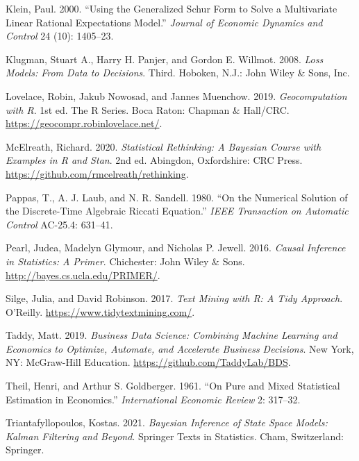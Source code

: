 \documentclass[
  letterpaper,
]{book}
\newlength{\cslhangindent}
\newlength{\cslentryspacingunit} %
\newenvironment{CSLReferences}[2] %
 {%
  \setlength{\parindent}{0pt}
  \ifodd #1
  \let\oldpar\par
  \def\par{\hangindent=\cslhangindent\oldpar}
  \fi
  \setlength{\parskip}{#2\cslentryspacingunit}
 }%
 {}
\begin{document}
\begin{CSLReferences}{1}{0}
\leavevmode{}%
Klein, Paul. 2000. {``Using the Generalized {S}chur Form to Solve a
Multivariate Linear Rational Expectations Model.''} \emph{Journal of
Economic Dynamics and Control} 24 (10): 1405--23.

\leavevmode{}%
Klugman, Stuart A., Harry H. Panjer, and Gordon E. Willmot. 2008.
\emph{Loss Models: From Data to Decisions}. Third. Hoboken, N.J.: John
Wiley \& Sons, Inc.

\leavevmode{}%
Lovelace, Robin, Jakub Nowosad, and Jannes Muenchow. 2019.
\emph{Geocomputation with {R}}. 1st ed. The {R} Series. Boca Raton:
Chapman \& Hall/CRC. \url{https://geocompr.robinlovelace.net/}.

\leavevmode{}%
McElreath, Richard. 2020. \emph{Statistical Rethinking: A Bayesian
Course with Examples in {R} and Stan}. 2nd ed. Abingdon, Oxfordshire:
CRC Press. \url{https://github.com/rmcelreath/rethinking}.

\leavevmode{}%
Pappas, T., A. J. Laub, and N. R. Sandell. 1980. {``On the Numerical
Solution of the Discrete-Time Algebraic Riccati Equation.''} \emph{IEEE
Transaction on Automatic Control} AC-25.4: 631--41.

\leavevmode{}%
Pearl, Judea, Madelyn Glymour, and Nicholas P. Jewell. 2016.
\emph{Causal Inference in Statistics: A Primer}. Chichester: John Wiley
\& Sons. \url{http://bayes.cs.ucla.edu/PRIMER/}.

\leavevmode{}%
Silge, Julia, and David Robinson. 2017. \emph{Text Mining with {R}: A
{T}idy Approach}. O'Reilly. \url{https://www.tidytextmining.com/}.

\leavevmode{}%
Taddy, Matt. 2019. \emph{Business Data Science: Combining Machine
Learning and Economics to Optimize, Automate, and Accelerate Business
Decisions}. New York, NY: McGraw-Hill Education.
\url{https://github.com/TaddyLab/BDS}.

\leavevmode{}%
Theil, Henri, and Arthur S. Goldberger. 1961. {``On Pure and Mixed
Statistical Estimation in Economics.''} \emph{International Economic
Review} 2: 317--32.

\leavevmode{}%
Triantafyllopoulos, Kostas. 2021. \emph{Bayesian Inference of State
Space Models: Kalman Filtering and Beyond}. Springer Texts in
Statistics. Cham, Switzerland: Springer.


\end{CSLReferences}
\end{document}
